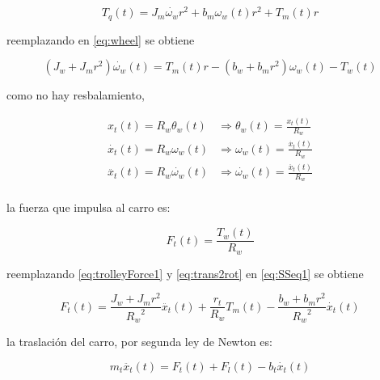 \documentclass{article}
\begin{document}
            \begin{equation} \label{eq:Tq}
                T_q(t) = J_m \dot{\omega_w} r^2 + b_m \omega_w(t) r^2 + T_m(t) r
            \end{equation}

            reemplazando en \ref{eq:wheel} se obtiene

            \begin{equation} \label{eq:SSeq1}
                (J_w + J_m r^2) \dot{\omega_w}(t) = T_m(t) r - (b_w + b_m r^2) \omega_w (t) - T_w(t)
            \end{equation}

            como no hay resbalamiento, 

            \begin{align} \label{eq:trans2rot} %
                x_t(t) = R_w \theta_w(t) &\Rightarrow \theta_w(t) = \frac{x_t(t)}{R_w}\\
                \dot{x_t}(t) = R_w \omega_w(t) &\Rightarrow \omega_w(t) = \frac{\dot{x_t}(t)}{R_w}\\
                \ddot{x_t}(t) = R_w \dot{\omega_w}(t) &\Rightarrow \dot{\omega_w}(t) = \frac{\ddot{x_t}(t)}{R_w}\\
            \end{align}

            la fuerza que impulsa al carro es:
    
            \begin{equation} \label{eq:trolleyForce1}
                F_t(t) = \frac{T_w(t)}{R_w}
            \end{equation}

            reemplazando \ref{eq:trolleyForce1} y \ref{eq:trans2rot} en \ref{eq:SSeq1} se obtiene


            \begin{equation} \label{eq:trolleyForce2}
                F_t(t) = \frac{J_w + J_m r^2}{{R_w}^2} \ddot{x_t}(t) + \frac{r_t}{R_w} T_m(t) - \frac{b_w + b_m r^2}{{R_w}^2} \dot{x_t}(t)
            \end{equation}

            la traslación del carro, por segunda ley de Newton es:

            \begin{equation} \label{eq:trolleyMovement}
                m_t \ddot{x_t}(t) = F_t(t) + F_l(t) - b_t \dot{x_t}(t)
            \end{equation}
            
\end{document}
